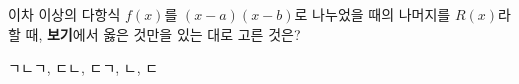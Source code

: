 이차 이상의 다항식 $f(x)$를 $(x-a)(x-b)$로 나누었을 때의 나머지를 $R(x)$라 할 때, \textbf{보기}에서 옳은 것만을 있는 대로 고른 것은?  
\begin{choices32}{ㄱ}{ㄴ}{ㄱ, ㄷ}{ㄴ, ㄷ}{ㄱ, ㄴ, ㄷ}\end{choices32}
